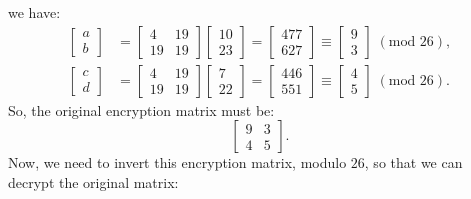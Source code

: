 \documentclass{article}
\begin{document}
we have:
\begin{align*}
    \begin{bmatrix}
        a \\
        b
    \end{bmatrix} &= \begin{bmatrix}
        4 & 19 \\
        19 & 19
    \end{bmatrix} \begin{bmatrix}
        10 \\
        23
    \end{bmatrix} = \begin{bmatrix}
        477 \\
        627
    \end{bmatrix} \equiv \begin{bmatrix}
        9 \\
        3
    \end{bmatrix} \; (\text{mod } 26), \\
    \begin{bmatrix}
        c \\
        d
    \end{bmatrix} &= \begin{bmatrix}
        4 & 19 \\
        19 & 19
    \end{bmatrix} \begin{bmatrix}
        7 \\
        22
    \end{bmatrix} = \begin{bmatrix}
        446 \\
        551
    \end{bmatrix} \equiv \begin{bmatrix}
        4 \\
        5
    \end{bmatrix} \; (\text{mod } 26).
\end{align*}
So, the original encryption matrix must be:
\[
    \begin{bmatrix}
        9 & 3 \\
        4 & 5
    \end{bmatrix}.
\]
Now, we need to invert this encryption matrix, modulo $26$, so that we can decrypt the original matrix:
\end{document}

